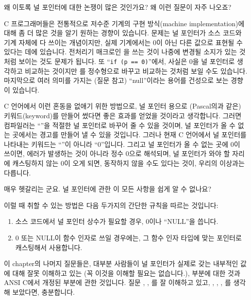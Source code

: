 \begin{faq}
	왜 이토록 널 포인터에 대한 논쟁이 많은 것인가요?
	왜 이런 질문이 자주 나오죠?

\A
	C 프로그래머들은 전통적으로 저수준 기계의 구현 방식(machine
	implementation)에 대해 좀 더 많은 것을 알기 원하는 경향이 있습니다.
	문제는 널 포인터가 소스 코드와 기계 자체에 다 쓰이는 개념이지만,
	실제 기계에서는 0이 아닌 다른 값으로 표현될 수 있다는 데에
	있습니다.  전처리기 매크로인 을 쓰는 것이 나중에 변경될 소지가
	있는 것처럼 보이는 것도 문제가 됩니다. 또 ``\verb+if (p == 0)+''에서,
	사실은 0을 널 포인터로 생각하고 비교하는 것이지만 를 정수형으로
	바꾸고 비교하는 것처럼 보일 수도 있습니다.
	마지막으로 여러 의미를 가지는 
	(질문  참고) ``null''이라는 용어를 건성으로 보는 경향이 있습니다.

	C 언어에서 이런 혼동을 없애기 위한 방법으로, 널 포인터 용으로 
	(Pascal의과 같은) 키워드(keyword)를 만들어 썼다면 좋은 효과를
	얻었을 것이라고 생각합니다. 그러면 컴파일러는 ``''을 적절한
	널 포인터로
	바꾸어 줄 수 있을 것이며, 널 포인터가 올 수 없는 곳에서는
	경고를 만들어 낼 수 있을 것입니다.  그러나 현재 C 언어에서
	널 포인터를 나타내는 키워드는 ``''이 아니라 ``0''입니다.
	그리고 널 포인터가 올 수 없는 곳에 0이 쓰이면, 에러가 발생하는
	것이 아니라 정수 0으로 해석되며, 널 포인터가 와야 할 자리에 캐스팅하지
	않는 0이 오게 되면, 동작하지 않을 수도 있다는 것이, 우리의 이상과는
	다릅니다.
\end{faq}

\begin{faq}
	매우 헷갈리는 군요.  널 포인터에 관한 이 모든 사항을
	쉽게 알 수 없나요?

\A
	이럴 때 취할 수 있는 방법은 다음 두가지의 간단한 규칙을 따르는
	것입니다:
\begin{enumerate}
	\item	소스 코드에서 널 포인터 상수가 필요할 경우, 0이나
	``NULL''을 씁니다.
	\item	0 또는 NULL이 함수 인자로 쓰일 경우에는, 그 함수 인자 타입에
	  맞는 포인터로 캐스팅해서 사용합니다.
\end{enumerate}
	이 chapter의 나머지 질문들은, 대부분 사람들이 널 포인터가 실제로 갖는
	내부적인 값에 대해 잘못 이해하고 있는 (꼭 이것을 이해할 필요는
	없습니다.), 부분에 대한 것과 ANSI C에서 개정된 부분에 관한 것입니다.
	질문 , , 를 잘 이해하고 있고, , , , 를
	생각해 보았다면, 충분합니다.
\end{faq}

